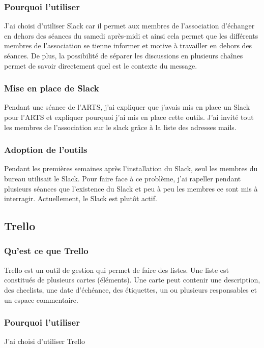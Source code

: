 \documentclass[12pt,a4paper]{report}
\begin{document}
      \subsubsection{Pourquoi l'utiliser}
        J'ai choisi d'utiliser Slack car il permet aux membres de l'association d'échanger en dehors des séances du samedi après-midi et ainsi cela permet que les différents membres de l'association se tienne informer et motive à travailler en dehors des séances. De plus, la possibilité de séparer les discussions en plusieurs chaînes permet de savoir directement quel est le contexte du message.

      \subsubsection{Mise en place de Slack}
        Pendant une séance de l'ARTS, j'ai expliquer que j'avais mis en place un Slack pour l'ARTS et expliquer pourquoi j'ai mis en place cette outils.
        J'ai invité tout les membres de l'association sur le slack grâce à la liste des adresses mails.

      \subsubsection{Adoption de l'outils}
        Pendant les premières semaines après l'installation du Slack, seul les membres du bureau utilisait le Slack. Pour faire face à ce problème, j'ai rapeller pendant plusieurs séances que l'existence du Slack et peu à peu les membres ce sont mis à interragir.
        Actuellement, le Slack est plut\^ot actif.

    \subsection{Trello}
      \subsubsection{Qu'est ce que Trello}
        Trello est un outil de gestion qui permet de faire des listes. Une liste est constitués de plusieurs cartes (éléments). Une carte peut contenir une description, des checlists, une date d'échéance, des étiquettes, un ou plusieurs responsables et un espace commentaire.

      \subsubsection{Pourquoi l'utiliser}
        J'ai choisi d'utiliser Trello
\end{document}
